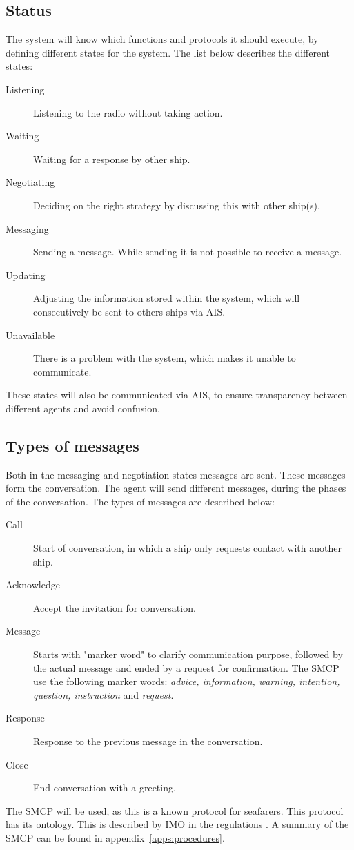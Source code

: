 \subsection{Status}
The system will know which functions and protocols it should execute, by defining different states for the system. The list below describes the different states:
\begin{description}
	\item [Listening] Listening to the radio without taking action.
	\item [Waiting] Waiting for a response by other ship.
	\item [Negotiating] Deciding on the right strategy by discussing this with other ship(s).
	\item [Messaging] Sending a message. While sending it is not possible to receive a message.
	\item [Updating] Adjusting the information stored within the system, which will consecutively be sent to others ships via \ac{AIS}.
	\item [Unavailable] There is a problem with the system, which makes it unable to communicate.
\end{description}
These states will also be communicated via \ac{AIS}, to ensure transparency between different agents and avoid confusion.

\subsection{Types of messages}
Both in the messaging and negotiation states messages are sent. These messages form the conversation. The agent will send different messages, during the phases of the conversation. The types of messages are described below:
\begin{description}
	\item [Call] Start of conversation, in which a ship only requests contact with another ship.
	\item [Acknowledge] Accept the invitation for conversation.
	\item [Message] Starts with "marker word" to clarify communication purpose, followed by the actual message and ended by a request for confirmation. The \ac{SMCP} use the following marker words: \emph{advice, information, warning, intention, question, instruction} and \emph{request}.
	\item [Response] Response to the previous message in the conversation.
	\item [Close] End conversation with a greeting.
\end{description}
The \acf{SMCP} will be used, as this is a known protocol for seafarers. This protocol has its ontology. This is described by \ac{IMO} in the \href{https://puc.overheid.nl/doc/PUC_1418_14/1/#16830}{regulations} \cite{IMO2000}. A summary of the \ac{SMCP} can be found in appendix~\ref{apps:procedures}.


